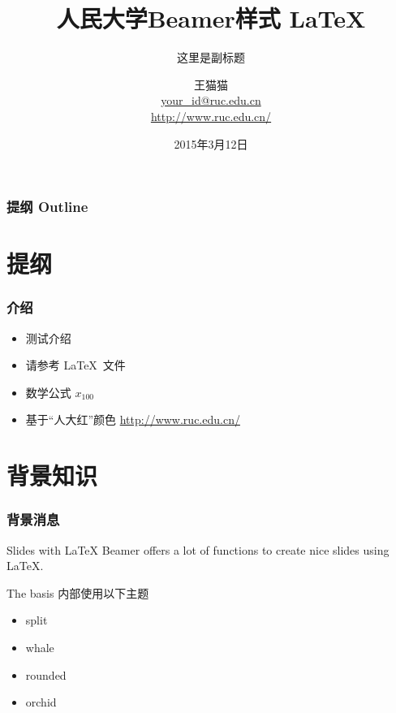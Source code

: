 \documentclass{beamer}
\title[RUC 样式 Beamer]{
  人民大学Beamer样式 \LaTeX}
\subtitle{这里是副标题}
\author[WANG Maomao]{
  王猫猫 \\\medskip
  {\small \url{your_id@ruc.edu.cn}} \\
  {\small \url{http://www.ruc.edu.cn/}}}
\institute[Renmin University of China]{
  XX学院 \\ %
  中国人民大学}
\date[Mar. 12 2015]{
  2015年3月12日}
\begin{document}
\begin{frame}
  \titlepage
\end{frame}

\begin{frame}
  \frametitle{提纲 Outline}

  \tableofcontents
\end{frame}

\section{提纲}

\begin{frame}
  \frametitle{介绍}

  \begin{itemize}
    \item 测试介绍
    \item 请参考 \LaTeX\ 文件
    \item 数学公式 $x_{100}$
    \item 基于“人大红”颜色 \url{http://www.ruc.edu.cn/}
  \end{itemize}
\end{frame}

\section{背景知识}

\begin{frame}
  \frametitle{背景消息}

  \begin{block}{Slides with \LaTeX}
    Beamer offers a lot of functions to create nice slides using \LaTeX.
  \end{block}

  \begin{block}{The basis}
    内部使用以下主题
    \begin{itemize}
      \item split
      \item whale
      \item rounded
      \item orchid
    \end{itemize}
  \end{block}
\end{frame}
\end{document}
